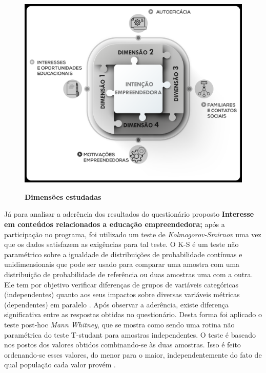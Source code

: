 \begin{figure}[H]
\centering
\caption{\textbf{Dimensões estudadas}}
\includegraphics[scale=0.15]{Imagens/dimencoes.png}
\label{figura_9}
\end{figure}



Já para analisar a aderência dos resultados do questionário proposto \textbf{Interesse em conteúdos relacionados a educação empreendedora;} após a participação no programa, foi utilizado um teste de \textit{Kolmogorov-Smirnov} uma vez que os dados satisfazem as exigências para tal teste. O K-S é um teste não paramétrico sobre a igualdade de distribuições de probabilidade contínuas e unidimensionais que pode ser usado para comparar uma amostra com uma distribuição de probabilidade de referência ou duas amostras uma com a outra. Ele tem por objetivo verificar diferenças de grupos de variáveis categóricas (independentes) quanto aos seus impactos sobre diversas variáveis métricas (dependentes) em paralelo \cite{hair_alise_2009}. Após observar a aderência, existe diferença significativa entre as respostas obtidas no questionário. Desta forma foi aplicado o teste post-hoc \textit{Mann Whitney}, que se mostra como sendo uma rotina não paramétrica do teste T-studant para amostras independentes. O teste é baseado nos postos dos valores obtidos combinando-se às duas amostras. Isso é feito ordenando-se esses valores, do menor para o maior, independentemente do fato de qual população cada valor provém \cite{matsouaka_optimal_2018}.

